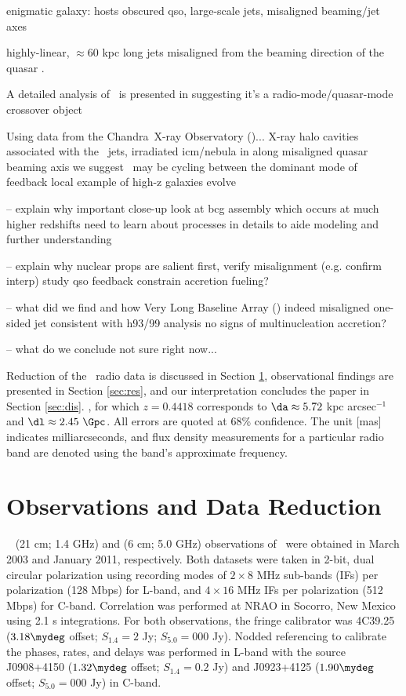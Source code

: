 \documentclass[11pt, preprint]{aastex}
\begin{document}
enigmatic galaxy: hosts obscured qso, large-scale jets, misaligned
beaming/jet axes

highly-linear, $\approx 60$ kpc long jets misaligned from the beaming
direction of the quasar \citep[][hereafter H93 and H99,
  respectively]{1993ApJ...415...82H, 1999ApJ...512..145H}.

A detailed analysis of \irs\ is presented in \citep{iras09} suggesting
it's a radio-mode/quasar-mode crossover object

Using data from the Chandra\ X-ray Observatory (\cxo)...
   X-ray halo cavities associated with the \irs\ jets,
   irradiated icm/nebula in along misaligned quasar beaming axis
   we suggest \irs\ may be cycling between the dominant mode of feedback
   local example of high-z galaxies evolve

-- explain why important
   close-up look at bcg assembly which occurs at much higher redshifts
   need to learn about processes in details to aide modeling and further
   understanding

-- explain why nuclear props are salient
   first, verify misalignment (e.g. confirm interp)
   study qso feedback
   constrain accretion fueling?

-- what did we find and how
   Very Long Baseline Array (\vlba)
   indeed misaligned
   one-sided jet consistent with h93/99 analysis
   no signs of multinucleation
   accretion?

-- what do we conclude
   not sure right now...

Reduction of the \vlba\ radio data is discussed in Section
\ref{sec:obs}, observational findings are presented in Section
\ref{sec:res}, and our interpretation concludes the paper in Section
\ref{sec:dis}. \LCDM, for which $z = 0.4418$ corresponds to $\da
\approx 5.72$ kpc arcsec$^{-1}$ and $\dl \approx 2.45~\Gpc$. All
errors are quoted at 68\% confidence. The unit [mas] indicates
milliarcseconds, and flux density measurements for a particular radio
band are denoted using the band's approximate frequency.

\section{Observations and Data Reduction}
\label{sec:obs}

\vlba\  (21 cm; 1.4 GHz) and
 (6 cm; 5.0 GHz) observations
of \irs\ were obtained in March 2003 and January 2011,
respectively. Both datasets were taken in 2-bit, dual circular
polarization using recording modes of $2\times8$ MHz sub-bands (IFs)
per polarization (128 Mbps) for L-band, and $4\times16$ MHz IFs per
polarization (512 Mbps) for C-band. Correlation was performed at NRAO
in Socorro, New Mexico using 2.1 s integrations. For both
observations, the fringe calibrator was 4C39.25 ($3.18\mydeg$ offset;
$S_{1.4} = 2$ Jy; $S_{5.0} = 000$ Jy). Nodded referencing to calibrate
the phases, rates, and delays was performed in L-band with the source
J0908+4150 ($1.32\mydeg$ offset; $S_{1.4} = 0.2$ Jy) and J0923+4125
($1.90\mydeg$ offset; $S_{5.0} = 000$ Jy) in C-band.
\end{document}
